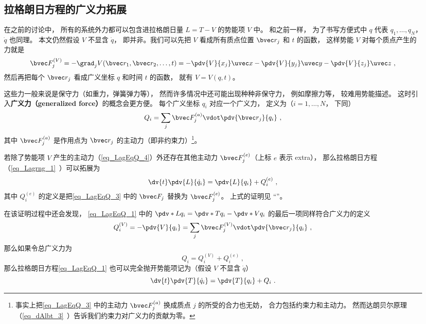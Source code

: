 

\subsection{拉格朗日方程的广义力拓展}
在之前的讨论中， 所有的系统外力都可以包含进拉格朗日量 $L = T-V$ 的势能项 $V$ 中。 和之前一样， 为了书写方便式中 $q$ 代表 $q_1, \dots, q_N$， $\dot q$ 也同理。 本文仍然假设 $V$ 不显含 $\dot q$， 即并非。我们可以先把 $V$ 看成所有质点位置 $\bvec r_j$ 和 $t$ 的函数， 这样势能 $V$ 对每个质点产生的力就是
\begin{equation}\label{eq_LagEqQ_4}
\bvec F_j^{(V)} = - \grad_j V(\bvec r_1,\bvec r_2,\dots,t) = -\pdv{V}{x_j}\uvec x - \pdv{V}{y_j}\uvec y - \pdv{V}{z_j} \uvec z~,
\end{equation}
然后再把每个 $\bvec r_j$ 看成广义坐标 $q$ 和时间 $t$ 的函数， 就有 $V = V(q,t)$。

这些力一般来说是保守力（如重力，弹簧弹力等）， 然而许多情况中还可能出现种种非保守力， 例如摩擦力等， 较难用势能描述。 这时引入\textbf{广义力（generalized force）}的概念会更方便。 每个广义坐标 $q_i$ 对应一个广义力， 定义为（$i=1,\dots,N$， 下同）
\begin{equation}\label{eq_LagEqQ_3}
Q_i = \sum_j \bvec F_j^{(a)} \vdot \pdv{\bvec r_j}{q_i}~,
\end{equation}
其中 $\bvec F_j^{(a)}$ 是作用点为 $\bvec r_j$ 的主动力（即非约束力）\footnote{事实上把\autoref{eq_LagEqQ_3} 中的主动力 $\bvec F_j^{(a)}$ 换成质点 $j$ 的所受的合力也无妨， 合力包括约束力和主动力。 然而达朗贝尔原理（\autoref{eq_dAlbt_3}~）告诉我们约束力对广义力的贡献为零。}。

若除了势能项 $V$ 产生的主动力（\autoref{eq_LagEqQ_4}）外还存在其他主动力 $\bvec F_j^{(e)}$（上标 $e$ 表示 extra）， 那么拉格朗日方程（\autoref{eq_Lagrng_1}~）可以拓展为
\begin{equation}\label{eq_LagEqQ_1}
\dv{t} \pdv{L}{\dot q_i} = \pdv{L}{q_i} + Q_i^{(e)}~,
\end{equation}
其中 $Q_i^{(e)}$ 的定义是把\autoref{eq_LagEqQ_3} 中的 $\bvec F_j$ 替换为 $\bvec F_j^{(e)}$。 上式的证明见 “”。

在该证明过程中还会发现， \autoref{eq_LagEqQ_1} 中的 $\pdv*{L}{q_i} = \pdv*{T}{q_i} - \pdv*{V}{q_i}$ 的最后一项同样符合广义力的定义
\begin{equation}
Q_i^{(V)} = -\pdv{V}{q_i} = \sum_j \bvec F_j^{(V)} \vdot \pdv{\bvec r_j}{q_i}~,
\end{equation}
那么如果令总广义力为
\begin{equation}
Q_i = Q_i^{(V)} + Q_i^{(e)}~,
\end{equation}
那么拉格朗日方程\autoref{eq_LagEqQ_1} 也可以完全抛开势能项记为（假设 $V$ 不显含 $\dot q$）
\begin{equation}\label{eq_LagEqQ_2}
\dv{t} \pdv{T}{\dot q_i} = \pdv{T}{q_i} + Q_i~.
\end{equation}

